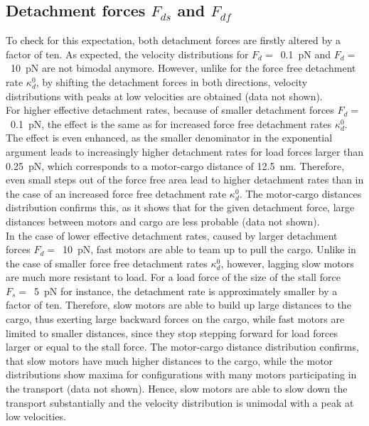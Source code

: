 \subsection{Detachment forces $F_{ds}$ and $F_{df}$}\label{ss.detachment-forces}
To check for this expectation, both detachment forces are firstly altered by a factor of ten. As expected, the velocity distributions for \mbox{$F_{d} = $ \SI{0.1}{\pico\newton}} and 
\mbox{$F_{d} = $ \SI{10}{\pico\newton}} are not bimodal anymore. However, unlike for the force free detachment rate $\kappa_d^0$, by shifting the detachment forces in both directions, velocity
distributions with peaks at low velocities are obtained (data not shown). \\
For higher effective detachment rates, because of smaller detachment forces \mbox{$F_{d} = $ \SI{0.1}{\pico\newton}}, the effect is the same as for increased force free detachment rates $\kappa_d^0$. The
effect is even enhanced, as the smaller denominator in the exponential argument leads to increasingly higher detachment rates for load forces larger than \SI{0.25}{\pico\newton}, which corresponds
to a motor-cargo distance of \SI{12.5}{\nano\metre}. Therefore, even small steps out of the force free area lead to higher detachment rates than in the case of an increased force free detachment
rate $\kappa_d^0$. The motor-cargo distances distribution confirms this, as it shows that for the given detachment force, large distances between motors and cargo are less probable (data not
shown). \\
In the case of lower effective detachment rates, caused by larger detachment forces \mbox{$F_{d} = $ \SI{10}{\pico\newton}}, fast motors are able to team up to pull the cargo. Unlike in the case of smaller
force free detachment rates $\kappa_d^0$, however, lagging slow motors are much more resistant to load. For a load force of the size of the stall force \mbox{$F_{s} = $ \SI{5}{\pico\newton}}
for instance, the detachment rate is approximately smaller by a factor of ten. Therefore, slow motors are able to build up large distances to the cargo, thus exerting large backward forces on the
cargo, while fast motors are limited to smaller distances, since they stop stepping forward for load forces larger or equal to the stall force. The motor-cargo distance distribution confirms, that slow
motors have much higher distances to the cargo, while the motor distributions show maxima for configurations with many motors participating in the transport (data not shown). Hence, slow motors are
able to slow down the transport substantially and the velocity distribution is unimodal with a peak at low velocities. \\
